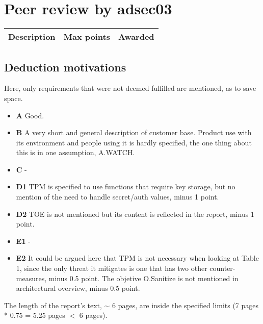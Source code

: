\documentclass{article}
\begin{document}
	\section{Peer review by adsec03}
	 \begin{tabular}{| l | c | c |}
        \hline
        \textbf{Description} & \textbf{Max points} & \textbf{Awarded} \\
        \hline
        \hline
        
    \end{tabular}
    

    \subsection{Deduction motivations}
      Here, only requirements that were not deemed fulfilled are mentioned, as to save space.
      
    	\begin{itemize}
    		\item{\textbf{A} Good.}
    		\item{\textbf{B} A very short and general description of customer base. Product use with its environment and people using it
    			is hardly specified, the one thing about this is in one assumption, A.WATCH.}
    		\item{\textbf{C} -}
    		\item{\textbf{D1} TPM is specified to use functions that require key storage, but no mention of the need to handle secret/auth values, minus 1 point.}
    		\item{\textbf{D2} TOE is not mentioned but its content is reflected in the report, minus 1 point.}
    		\item{\textbf{E1} - }
    		\item{\textbf{E2} It could be argued here that TPM is not necessary when looking at Table 1, since the only threat it mitigates is one that 
    			has two other counter-measures, minus 0.5 point. The objetive O.Sanitize is not mentioned in architectural overview, minus 0.5 point. }
    	\end{itemize}
    	
    	The length of the report's text, $\sim$ 6 pages, are inside the specified limits (7 pages * 0.75 = 5.25 pages $<$ 6 pages).
\end{document}
